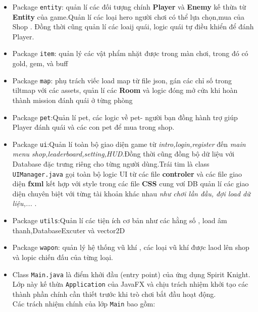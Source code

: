 \documentclass[12pt,a4paper]{report}
\begin{document}
\begin{itemize}
        gọi các hiệu ứng của toàn bộ vòng lăp game.Đông thời chứa class \texttt{Camera.java} quản lí góc nhìn của game
        với trung tâm là player,class \texttt{InputHandler.java} phụ trách việc tiếp nhận dữ liệu đầu vào để điều
        khiển game -đặc biệt là có thể chơi cảm ứng với touchpad.
        \item Package \texttt{entity}: quản lí các đối tượng chính \textbf{Player} và \textbf{Enemy} kế thừa từ
        \textbf{Entity} của game.Quản lí các loại hero người chơi có thể lựa chọn,mua của Shop . Đồng thời
        cũng quản lí các loaij quái, logic quái tự điều khiển để đánh Player.
        \item Package \texttt{item}: quản lý các vật phẩm nhặt được trong màn chơi, trong đó có
        gold, gem, và buff
        \item Package \texttt{map}: phụ trách viếc load map từ file json, gán các chỉ số trong tiltmap với
        các assets, quản lí các \textbf{Room} và logic đóng mở cửa khi hoàn thành mission đánh quái
        ở từng phòng
        \item Package \texttt{pet}:Quản lí pet, các logic về pet- người bạn đồng hành trợ giúp Player
        đánh quái và các con pet để mua trong shop.
        \item Package \texttt{ui}:Quản lí toàn bộ giao diện game từ \textit{ intro,login,register} đến \textit{main menu
        shop,leaderboard,setting,HUD}.Đồng thời cũng đồng bộ dữ liệu với Database đặc trưng riêng cho từng
        người dùng.Trái tim là class \texttt{UIManager.java} gọi toàn bộ logic UI từ các file \textbf{controler} và
        các file giao diện \textbf{fxml} kết hợp với style trong các file \textbf{CSS} cung vơí DB
        quản lí các giao diện chuyên biệt với từng tài khoản khác nhau \textit{như chơi lần đầu, đợi load
        dữ liệu,...} .
        \item Package \texttt{utils}:Quản lí các tiện ích cơ bản như các hằng số , load âm thanh,DatabaseExcuter
        và vector2D
        \item Package \texttt{wapon}: quản lý hệ thống vũ khí , các loại vũ khí được laod lên shop và lopic chiến
        đấu của từng loại.
        \item Class \texttt{Main.java}
        là điểm khởi đầu (entry point) của ứng dụng
        Spirit Knight. Lớp này kế thừa \texttt{Application} của JavaFX
        và chịu trách nhiệm khởi tạo các thành phần chính cần thiết trước
        khi trò chơi bắt đầu hoạt động.\\
        Các trách nhiệm chính của lớp \texttt{Main} bao gồm:


\end{itemize}
\end{document}
